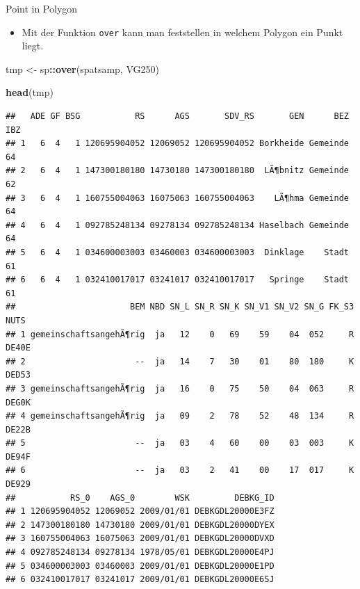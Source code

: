 \documentclass[ignorenonframetext,]{beamer}
\newenvironment{Shaded}{\begin{snugshade}}{\end{snugshade}}
\newcommand{\KeywordTok}[1]{\textcolor[rgb]{0.13,0.29,0.53}{\textbf{#1}}}
\newcommand{\NormalTok}[1]{#1}
\newcommand{\OperatorTok}[1]{\textcolor[rgb]{0.81,0.36,0.00}{\textbf{#1}}}
\newcommand{\StringTok}[1]{\textcolor[rgb]{0.31,0.60,0.02}{#1}}
\providecommand{\tightlist}{%
  \setlength{\itemsep}{0pt}\setlength{\parskip}{0pt}}
\begin{document}
\begin{frame}[fragile]{Point in Polygon}
\protect\hypertarget{point-in-polygon}{}

\begin{itemize}
\tightlist
\item
  Mit der Funktion \texttt{over} kann man feststellen in welchem Polygon
  ein Punkt liegt.
\end{itemize}

\begin{Shaded}
\begin{Highlighting}[]
\NormalTok{tmp <-}\StringTok{ }\NormalTok{sp}\OperatorTok{::}\KeywordTok{over}\NormalTok{(spatsamp, VG250)}
\end{Highlighting}
\end{Shaded}

\begin{Shaded}
\begin{Highlighting}[]
\KeywordTok{head}\NormalTok{(tmp)}
\end{Highlighting}
\end{Shaded}

\begin{verbatim}
##   ADE GF BSG           RS      AGS       SDV_RS       GEN      BEZ IBZ
## 1   6  4   1 120695904052 12069052 120695904052 Borkheide Gemeinde  64
## 2   6  4   1 147300180180 14730180 147300180180  LÃ¶bnitz Gemeinde  62
## 3   6  4   1 160755004063 16075063 160755004063    LÃ¶hma Gemeinde  64
## 4   6  4   1 092785248134 09278134 092785248134 Haselbach Gemeinde  64
## 5   6  4   1 034600003003 03460003 034600003003  Dinklage    Stadt  61
## 6   6  4   1 032410017017 03241017 032410017017   Springe    Stadt  61
##                       BEM NBD SN_L SN_R SN_K SN_V1 SN_V2 SN_G FK_S3  NUTS
## 1 gemeinschaftsangehÃ¶rig  ja   12    0   69    59    04  052     R DE40E
## 2                      --  ja   14    7   30    01    80  180     K DED53
## 3 gemeinschaftsangehÃ¶rig  ja   16    0   75    50    04  063     R DEG0K
## 4 gemeinschaftsangehÃ¶rig  ja   09    2   78    52    48  134     R DE22B
## 5                      --  ja   03    4   60    00    03  003     K DE94F
## 6                      --  ja   03    2   41    00    17  017     K DE929
##           RS_0    AGS_0        WSK         DEBKG_ID
## 1 120695904052 12069052 2009/01/01 DEBKGDL20000E3FZ
## 2 147300180180 14730180 2009/01/01 DEBKGDL20000DYEX
## 3 160755004063 16075063 2009/01/01 DEBKGDL20000DVXD
## 4 092785248134 09278134 1978/05/01 DEBKGDL20000E4PJ
## 5 034600003003 03460003 2009/01/01 DEBKGDL20000E1PD
## 6 032410017017 03241017 2009/01/01 DEBKGDL20000E6SJ
\end{verbatim}

\end{frame}
\end{document}

